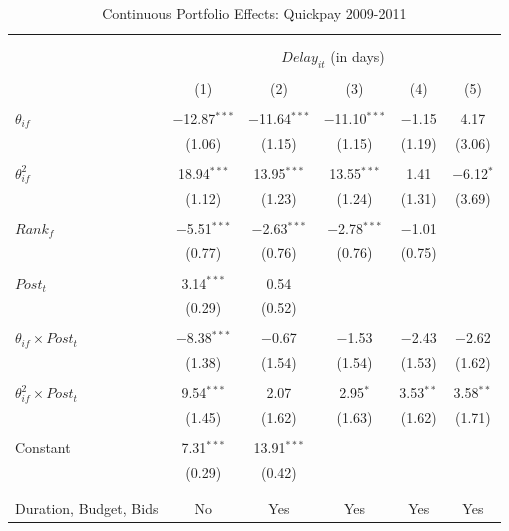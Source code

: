 \documentclass[
]{article}
\begin{document}
\begin{table}[H] \centering 
  \caption{Continuous Portfolio Effects: Quickpay 2009-2011} 
  \label{} 
\small 
\begin{tabular}{@{\extracolsep{-2pt}}lccccc} 
\\[-1.8ex]\hline 
\hline \\[-1.8ex] 
\\[-1.8ex] & \multicolumn{5}{c}{$Delay_{it}$ (in days)} \\ 
\\[-1.8ex] & (1) & (2) & (3) & (4) & (5)\\ 
\hline \\[-1.8ex] 
 $\theta_{if}$ & $-$12.87$^{***}$ & $-$11.64$^{***}$ & $-$11.10$^{***}$ & $-$1.15 & 4.17 \\ 
  & (1.06) & (1.15) & (1.15) & (1.19) & (3.06) \\ 
  & & & & & \\ 
 $\theta_{if}^2$ & 18.94$^{***}$ & 13.95$^{***}$ & 13.55$^{***}$ & 1.41 & $-$6.12$^{*}$ \\ 
  & (1.12) & (1.23) & (1.24) & (1.31) & (3.69) \\ 
  & & & & & \\ 
 $Rank_f$ & $-$5.51$^{***}$ & $-$2.63$^{***}$ & $-$2.78$^{***}$ & $-$1.01 &  \\ 
  & (0.77) & (0.76) & (0.76) & (0.75) &  \\ 
  & & & & & \\ 
 $Post_t$ & 3.14$^{***}$ & 0.54 &  &  &  \\ 
  & (0.29) & (0.52) &  &  &  \\ 
  & & & & & \\ 
 $\theta_{if} \times Post_t$ & $-$8.38$^{***}$ & $-$0.67 & $-$1.53 & $-$2.43 & $-$2.62 \\ 
  & (1.38) & (1.54) & (1.54) & (1.53) & (1.62) \\ 
  & & & & & \\ 
 $\theta_{if}^2 \times Post_t$ & 9.54$^{***}$ & 2.07 & 2.95$^{*}$ & 3.53$^{**}$ & 3.58$^{**}$ \\ 
  & (1.45) & (1.62) & (1.63) & (1.62) & (1.71) \\ 
  & & & & & \\ 
 Constant & 7.31$^{***}$ & 13.91$^{***}$ &  &  &  \\ 
  & (0.29) & (0.42) &  &  &  \\ 
  & & & & & \\ 
\hline \\[-1.8ex] 
Duration, Budget, Bids & No & Yes & Yes & Yes & Yes \\ 

\end{tabular}
\end{table}
\end{document}
